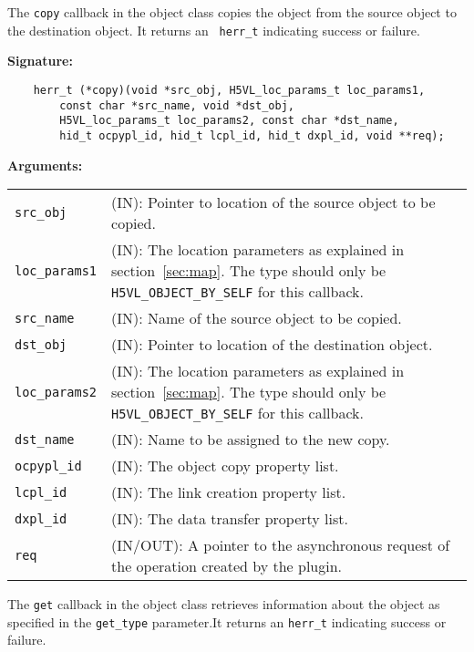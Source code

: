 The \texttt{copy} callback in the object class  copies the object
from the source object to the destination object. It returns an \texttt{
  herr\_t} indicating success or failure.\bigskip

\begin{mdframed}[style=bgbox]
\textbf{Signature:}
\begin{lstlisting}
    herr_t (*copy)(void *src_obj, H5VL_loc_params_t loc_params1, 
        const char *src_name, void *dst_obj, 
        H5VL_loc_params_t loc_params2, const char *dst_name,
        hid_t ocpypl_id, hid_t lcpl_id, hid_t dxpl_id, void **req);
\end{lstlisting}

\textbf{Arguments:}\\
\begin{tabular}{l p{10cm}}
  \texttt{src\_obj} & (IN): Pointer to location of the source object to
  be copied.\\
  \texttt{loc\_params1} & (IN): The location parameters as explained in
  section~\ref{sec:map}. The type should only be \texttt{H5VL\_OBJECT\_BY\_SELF} for this callback.\\
  \texttt{src\_name} & (IN): Name of the source object to
  be copied.\\
  \texttt{dst\_obj} & (IN): Pointer to location of the destination
  object.\\
  \texttt{loc\_params2} & (IN): The location parameters as explained in
  section~\ref{sec:map}. The type should only be \texttt{H5VL\_OBJECT\_BY\_SELF} for this callback.\\
  \texttt{dst\_name} & (IN): Name to be assigned to the new copy.\\
  \texttt{ocpypl\_id} & (IN): The object copy property list.\\
  \texttt{lcpl\_id} & (IN): The link creation property list.\\
  \texttt{dxpl\_id} & (IN): The data transfer property list.\\
  \texttt{req} & (IN/OUT): A pointer to the asynchronous request of the
  operation created by the plugin.\\
\end{tabular}
\end{mdframed}

The \texttt{get} callback in the object class retrieves information
about the object as specified in the \texttt{get\_type} parameter.It
returns an \texttt{herr\_t} indicating success or failure.\bigskip

